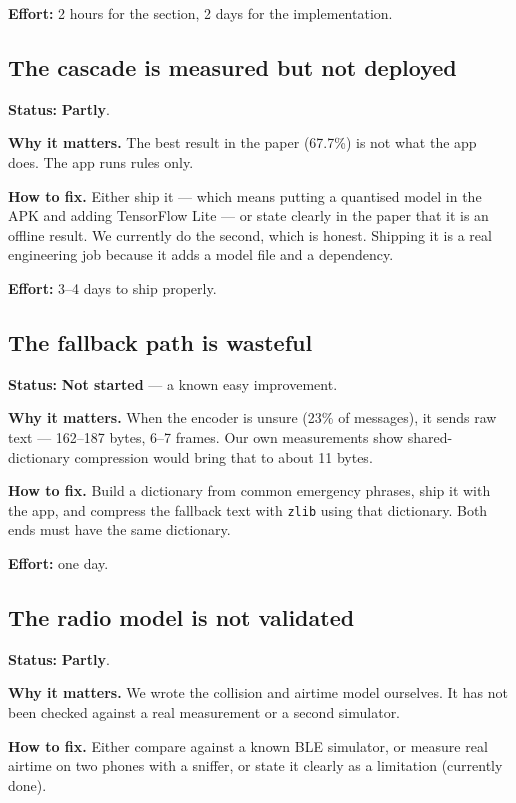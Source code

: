 \documentclass[11pt,a4paper]{article}
\newcommand{\partly}{\textcolor{warn}{\textbf{Partly}}}
\newcommand{\todo}{\textcolor{bad}{\textbf{Not started}}}
\begin{document}
\textbf{Effort:} 2 hours for the section, 2 days for the implementation.

\subsection{The cascade is measured but not deployed}

\textbf{Status:} \partly{}.

\textbf{Why it matters.} The best result in the paper (67.7\%) is not what the
app does. The app runs rules only.

\textbf{How to fix.} Either ship it --- which means putting a quantised model
in the APK and adding TensorFlow Lite --- or state clearly in the paper that
it is an offline result. We currently do the second, which is honest. Shipping
it is a real engineering job because it adds a model file and a dependency.

\textbf{Effort:} 3--4 days to ship properly.

\subsection{The fallback path is wasteful}

\textbf{Status:} \todo{} --- a known easy improvement.

\textbf{Why it matters.} When the encoder is unsure (23\% of messages), it
sends raw text --- 162--187 bytes, 6--7 frames. Our own measurements show
shared-dictionary compression would bring that to about 11 bytes.

\textbf{How to fix.} Build a dictionary from common emergency phrases, ship it
with the app, and compress the fallback text with \texttt{zlib} using that
dictionary. Both ends must have the same dictionary.

\textbf{Effort:} one day.

\subsection{The radio model is not validated}

\textbf{Status:} \partly{}.

\textbf{Why it matters.} We wrote the collision and airtime model ourselves. It
has not been checked against a real measurement or a second simulator.

\textbf{How to fix.} Either compare against a known BLE simulator, or measure
real airtime on two phones with a sniffer, or state it clearly as a limitation
(currently done).
\end{document}
